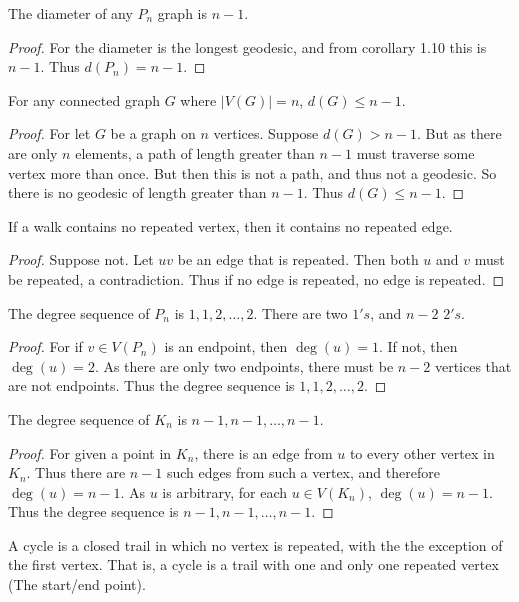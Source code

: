 \documentclass[crop=false,class=book]{standalone}
\begin{document}
\begin{corollary}
The diameter of any $P_n$ graph is $n-1$.
\end{corollary}
\begin{proof}
For the diameter is the longest geodesic, and from corollary 1.10 this is $n-1$. Thus $d(P_n) = n-1$.
\end{proof}
\begin{corollary}
For any connected graph $G$ where $|V(G)| = n$, $d(G) \leq n-1$.
\end{corollary}
\begin{proof}
For let $G$ be a graph on $n$ vertices. Suppose $d(G)>n-1$. But as there are only $n$ elements, a path of length greater than $n-1$ must traverse some vertex more than once. But then this is not a path, and thus not a geodesic. So there is no geodesic of length greater than $n-1$. Thus $d(G)\leq n-1$.
\end{proof}
\begin{theorem}
If a walk contains no repeated vertex, then it contains no repeated edge.
\end{theorem}
\begin{proof}
Suppose not. Let $uv$ be an edge that is repeated. Then both $u$ and $v$ must be repeated, a contradiction. Thus if no edge is repeated, no edge is repeated.
\end{proof}
\begin{corollary}
The degree sequence of $P_n$ is $1,1,2,\hdots, 2$. There are two $1's$, and $n-2$ $2's$.
\end{corollary}
\begin{proof}
For if $v\in V(P_n)$ is an endpoint, then $\deg(u) = 1$. If not, then $\deg(u) = 2$. As there are only two endpoints, there must be $n-2$ vertices that are not endpoints. Thus the degree sequence is $1,1,2,\hdots,2$.
\end{proof}
\begin{corollary}
The degree sequence of $K_n$ is $n-1,n-1,\hdots, n-1$.
\end{corollary}
\begin{proof}
For given a point in $K_n$, there is an edge from $u$ to every other vertex in $K_n$. Thus there are $n-1$ such edges from such 
a vertex, and therefore $\deg(u) = n-1$. As $u$ is arbitrary, for each $u\in V(K_n)$, $\deg(u) = n-1$. Thus the degree sequence is $n-1,n-1,\hdots, n-1$.
\end{proof}
\begin{definition}
A cycle is a closed trail in which no vertex is repeated, with the the exception of the first vertex. That is, a cycle is a trail with one and only one repeated vertex (The start/end point).
\end{definition}
\end{document}
